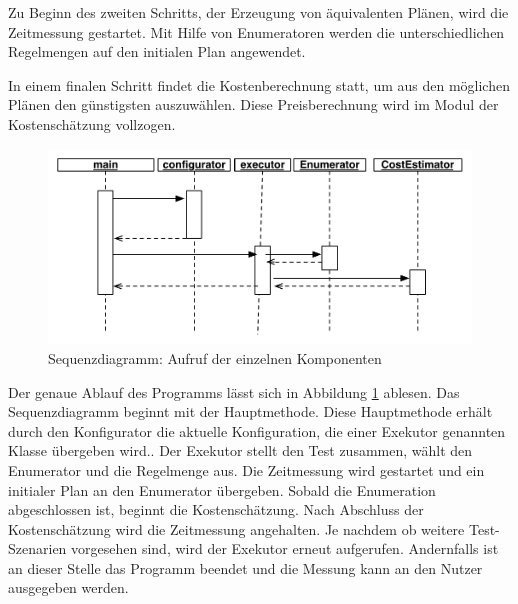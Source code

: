 Zu Beginn des zweiten Schritts, der Erzeugung von äquivalenten Plänen, wird die Zeitmessung gestartet.  Mit Hilfe von Enumeratoren werden die unterschiedlichen Regelmengen auf den initialen Plan angewendet.

In einem finalen Schritt findet die Kostenberechnung statt, um aus den möglichen Plänen den günstigsten auszuwählen. Diese Preisberechnung wird im Modul der Kostenschätzung vollzogen.



\begin{figure}[ht]
  \centering
  \includegraphics[width=\textwidth]{04_Implementierung/00_media/SequenceDiagramConfiguration.pdf}
  \caption{Sequenzdiagramm: Aufruf der einzelnen Komponenten}
  \label{SequenceDiagramConfiguration}
\end{figure}


Der genaue Ablauf des Programms lässt sich in Abbildung \ref{SequenceDiagramConfiguration} ablesen. Das Sequenzdiagramm beginnt mit der Hauptmethode. Diese Hauptmethode erhält durch den Konfigurator die aktuelle Konfiguration, die einer Exekutor genannten Klasse  übergeben wird.. Der Exekutor stellt den Test zusammen, wählt den Enumerator und die Regelmenge aus. Die Zeitmessung wird gestartet und ein initialer Plan an den Enumerator übergeben. Sobald die Enumeration abgeschlossen ist, beginnt die Kostenschätzung. Nach Abschluss der Kostenschätzung wird die Zeitmessung angehalten. Je nachdem ob weitere Test-Szenarien vorgesehen sind, wird der Exekutor erneut aufgerufen. Andernfalls ist an dieser Stelle das Programm beendet und die Messung kann an den Nutzer ausgegeben werden.
